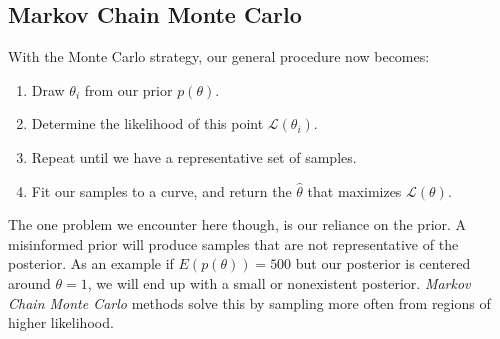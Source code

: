 \subsection{Markov Chain Monte Carlo}\label{subsec:markovChainMonteCarlo}
With the Monte Carlo strategy, our general procedure now becomes:
\begin{enumerate}
    \item Draw $\theta_i$ from our prior $p(\theta)$.
    \item Determine the likelihood of this point $\mathcal{L}(\theta_i)$.
    \item Repeat until we have a representative set of samples.
    \item Fit our samples to a curve, and return the $\hat{\theta}$ that maximizes $\mathcal{L}(\theta)$.
\end{enumerate}
The one problem we encounter here though, is our reliance on the prior.
A misinformed prior will produce samples that are not representative of the posterior.
As an example if $E(p(\theta)) = 500$ but our posterior is centered around $\theta = 1$, we will end up with a small or
nonexistent posterior.
\emph{Markov Chain Monte Carlo} methods solve this by sampling more often from regions of higher likelihood.


